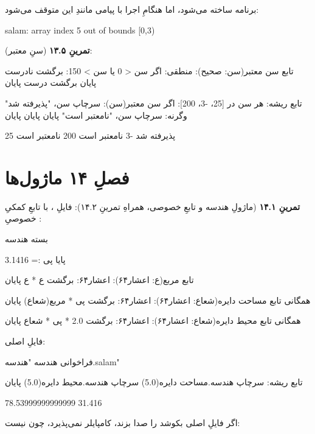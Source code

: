 برنامه ساخته می‌شود، اما هنگامِ اجرا با پیامی مانندِ این متوقف می‌شود:

\begin{progoutfa}
salam: array index 5 out of bounds [0,3)
\end{progoutfa}

\textbf{تمرینِ ۱۳.۵} (سنِ معتبر):
\begin{salamfa}
تابع سن معتبر(سن: صحیح): منطقی:
    اگر سن < 0 یا سن > 150:
        برگشت نادرست
    پایان
    برگشت درست
پایان

تابع ریشه:
    هر سن در [25، -3، 200]:
        اگر سن معتبر(سن):
            سرچاپ سن، "پذیرفته شد"
        وگرنه:
            سرچاپ سن، "نامعتبر است"
        پایان
    پایان
پایان
\end{salamfa}

\begin{progoutfa}
25 پذیرفته شد
-3 نامعتبر است
200 نامعتبر است
\end{progoutfa}

\section*{فصلِ ۱۴ ماژول‌ها}
{}

\textbf{تمرینِ ۱۴.۱} (ماژولِ هندسه و تابعِ خصوصی، همراهِ تمرینِ ۱۴.۲): فایلِ ، با تابعِ کمکیِ خصوصیِ :
\begin{salamfa}
بسته هندسه

پایا پی := 3.1416

تابع مربع(ع: اعشار۶۴): اعشار۶۴:
    برگشت ع * ع
پایان

همگانی تابع مساحت دایره(شعاع: اعشار۶۴): اعشار۶۴:
    برگشت پی * مربع(شعاع)
پایان

همگانی تابع محیط دایره(شعاع: اعشار۶۴): اعشار۶۴:
    برگشت 2.0 * پی * شعاع
پایان
\end{salamfa}

فایلِ اصلی:
\begin{salamfa}
فراخوانی هندسه "هندسه.salam"

تابع ریشه:
    سرچاپ هندسه.مساحت دایره(5.0)
    سرچاپ هندسه.محیط دایره(5.0)
پایان
\end{salamfa}

\begin{progoutfa}
78.53999999999999
31.416
\end{progoutfa}

اگر فایلِ اصلی بکوشد  را صدا بزند، کامپایلر نمی‌پذیرد، چون   نیست:

